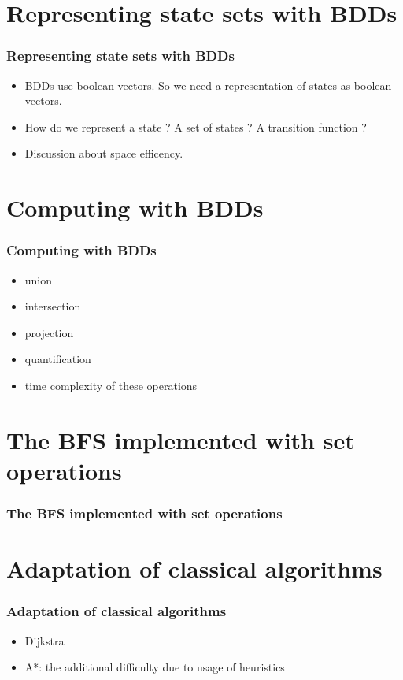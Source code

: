 \documentclass[10pt,a4paper]{beamer}
\begin{document}
\begin{frame}

\end{frame}
\section{Representing  state sets with BDDs}
\begin{frame}
\frametitle{Representing  state sets with BDDs}
	\begin{itemize}
	\item BDDs use boolean vectors.  So we need a representation of states as boolean vectors.
	\item How do we represent a state ? A set of states ? A transition function ?
	\item Discussion about space efficency.
	\end{itemize}
\end{frame}

\section{Computing with BDDs}
\begin{frame}
\frametitle{Computing with BDDs}

\begin{itemize}
\item union
\item intersection
\item projection
\item quantification
\item time complexity of these operations
\end{itemize}

\end{frame}

\section{The BFS implemented with set operations}
\begin{frame}
\frametitle{The BFS implemented with set operations}
\end{frame}

\section{Adaptation of classical algorithms}
\begin{frame}
\frametitle{Adaptation of classical algorithms}

	\begin{itemize}
	\item Dijkstra
	\item A*: the additional difficulty due to usage of heuristics
	\end{itemize}
\end{frame}
\end{document}
